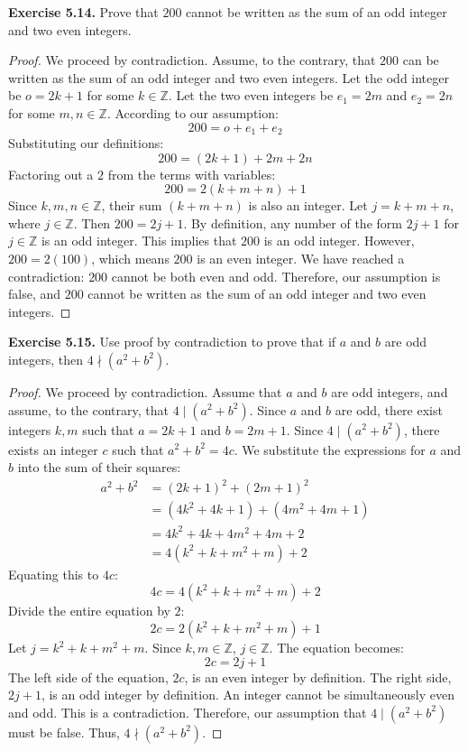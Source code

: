 \documentclass[11pt, letterpaper]{article}
\theoremstyle{remark}
\newcommand{\Z}{\mathbb{Z}}
\begin{document}
\textbf{Exercise 5.14.} Prove that $200$ cannot be written as the sum of an odd integer and two even integers.
\begin{proof}
We proceed by contradiction. Assume, to the contrary, that $200$ can be written as the sum of an odd integer and two even integers.
Let the odd integer be $o = 2k + 1$ for some $k \in \Z$.
Let the two even integers be $e_1 = 2m$ and $e_2 = 2n$ for some $m, n \in \Z$.
According to our assumption:
\[ 200 = o + e_1 + e_2 \]
Substituting our definitions:
\[ 200 = (2k + 1) + 2m + 2n \]
Factoring out a $2$ from the terms with variables:
\[ 200 = 2(k + m + n) + 1 \]
Since $k, m, n \in \Z$, their sum $(k + m + n)$ is also an integer. Let $j = k + m + n$, where $j \in \Z$.
Then $200 = 2j + 1$.
By definition, any number of the form $2j + 1$ for $j \in \Z$ is an odd integer. This implies that $200$ is an odd integer.
However, $200 = 2(100)$, which means $200$ is an even integer.
We have reached a contradiction: $200$ cannot be both even and odd.
Therefore, our assumption is false, and $200$ cannot be written as the sum of an odd integer and two even integers.
\end{proof}

\textbf{Exercise 5.15.} Use proof by contradiction to prove that if $a$ and $b$ are odd integers, then $4 \nmid (a^2 + b^2)$.
\begin{proof}
We proceed by contradiction. Assume that $a$ and $b$ are odd integers, and assume, to the contrary, that $4 \mid (a^2 + b^2)$.
Since $a$ and $b$ are odd, there exist integers $k, m$ such that $a = 2k + 1$ and $b = 2m + 1$.
Since $4 \mid (a^2 + b^2)$, there exists an integer $c$ such that $a^2 + b^2 = 4c$.
We substitute the expressions for $a$ and $b$ into the sum of their squares:
\begin{align*}
a^2 + b^2 &= (2k + 1)^2 + (2m + 1)^2 \\
&= (4k^2 + 4k + 1) + (4m^2 + 4m + 1) \\
&= 4k^2 + 4k + 4m^2 + 4m + 2 \\
&= 4(k^2 + k + m^2 + m) + 2
\end{align*}
Equating this to $4c$:
\[ 4c = 4(k^2 + k + m^2 + m) + 2 \]
Divide the entire equation by $2$:
\[ 2c = 2(k^2 + k + m^2 + m) + 1 \]
Let $j = k^2 + k + m^2 + m$. Since $k, m \in \Z$, $j \in \Z$.
The equation becomes:
\[ 2c = 2j + 1 \]
The left side of the equation, $2c$, is an even integer by definition. The right side, $2j + 1$, is an odd integer by definition.
An integer cannot be simultaneously even and odd. This is a contradiction.
Therefore, our assumption that $4 \mid (a^2 + b^2)$ must be false. Thus, $4 \nmid (a^2 + b^2)$.
\end{proof}
\end{document}
